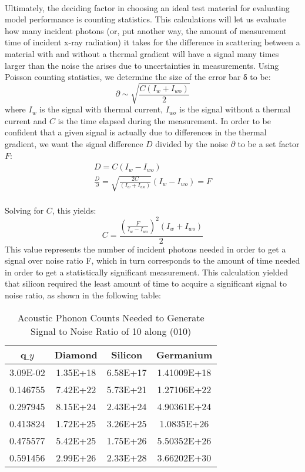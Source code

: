 \documentclass[aip,jap,12 pt,preprint]{revtex4-1}
\begin{document}
\\
Ultimately, the deciding factor in choosing an ideal test material for evaluating model performance is counting statistics. This calculations will let us evaluate how many incident photons (or, put another way, the amount of measurement time of incident x-ray radiation) it takes for the difference in scattering between a material with and without a thermal gradient will have a signal many times larger than the noise the arises due to uncertainties in measurements. Using Poisson counting statistics, we determine the size of the error bar δ to be:
\begin{equation}
\partial \sim \sqrt{\frac{C(I_w + I_{wo})}{2}}
\end{equation}
where $I_w$ is the signal with thermal current, $I_{wo}$ is the signal without a thermal current and $C$ is the time elapsed during the measurement. In order to be confident that a given signal is actually due to differences in the thermal gradient, we want the signal difference $D$ divided by the noise $\partial$ to be a set factor $F$:
\begin{eqnarray}
D = C(I_w - I_{wo})\\
\frac{D}{\partial} = \sqrt{\frac{2C}{(I_w + I_{wo})}}(I_w - I_{wo}) = F
\end{eqnarray}
\\
Solving for $C$, this yields:
\begin{equation}
C = \frac{(\frac{F}{I_w - I_{wo}})^2(I_w + I_{wo})}{2}
\end{equation}
This value represents the number of incident photons needed in order to get a signal over noise ratio F, which in turn corresponds to the amount of time needed in order to get a statistically significant measurement. This calculation yielded that silicon required the least amount of time to acquire a significant signal to noise ratio, as shown in the following table:
\begin{table}[b]
\centering
\caption{Acoustic Phonon Counts Needed to Generate Signal to Noise Ratio of 10 along (010)}
\label{my-label}
\begin{tabular}{|c|c|c|c|}
\hline
q$\_y$     & Diamond  & Silicon  & Germanium   \\ \hline
3.09E-02 & 1.35E+18 & 6.58E+17 & 1.41009E+18 \\ \hline
0.146755 & 7.42E+22 & 5.73E+21 & 1.27106E+22 \\ \hline
0.297945 & 8.15E+24 & 2.43E+24 & 4.90361E+24 \\ \hline
0.413824 & 1.72E+25 & 3.26E+25 & 1.0835E+26  \\ \hline
0.475577 & 5.42E+25 & 1.75E+26 & 5.50352E+26 \\ \hline
0.591456 & 2.99E+26 & 2.33E+28 & 3.66202E+30 \\ \hline
\end{tabular}
\end{table}
\end{document}
